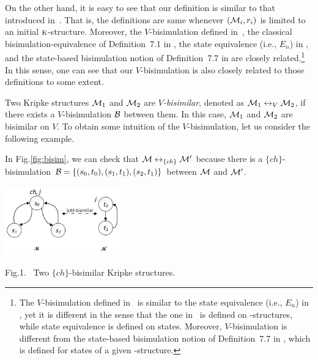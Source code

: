 \documentclass[runningheads]{llncs}
\begin{document}
On the other hand, it is easy to see that our definition is similar to that introduced in~\cite{renyansfirstpaper}. That is, the definitions are same whenever $({\cal M}_i, r_i)$ is limited to an initial $\textsc{k}$-structure.
Moreover, the $V$-bisimulation defined in~\cite{renyansfirstpaper}, the classical
bisimulation-equivalence of Definition~7.1 in \cite{Baier:PMC:2008}, the state equivalence (i.e., $E_n$) in \cite{browne1988characterizing}, and the state-based bisimulation notion of Definition~7.7 in \cite{Baier:PMC:2008} are closely related.\footnote{The $V$-bisimulation defined in~\cite{renyansfirstpaper} is similar to
	the state equivalence (i.e., $E_n$) in \cite{browne1988characterizing}, yet it is
	different in the sense that the one in~\cite{renyansfirstpaper} is defined on \MPK-structures,
	while state equivalence is defined on states.
	Moreover, $V$-bisimulation is different
	from  the state-based bisimulation notion of Definition~7.7 in \cite{Baier:PMC:2008},
	which is defined for states of a given \MPK-structure.}
In this sense, one can see that our $V$-bisimulation is also closely related to those definitions to some extent.

Two Kripke structures ${\cal M}_1$ and ${\cal M}_2$ are \emph{$V$-bisimilar}, denoted as ${\cal M}_1 \leftrightarrow_V {\cal M}_2$, if there exists a $V$-bisimulation ${\cal B}$ between them.
In this case, ${\cal M}_1$ and ${\cal M}_2$ are bisimilar on $V$.
To obtain  some intuition of the $V$-bisimulation, let us consider the following example.

\begin{example}
	In Fig.\ref{fig:bisim}, we can check that ${\cal M} \leftrightarrow_{\{ch\}} {\cal M}'$ because there is a $\{ch\}$-bisimulation ${\cal B}=\{(s_0, t_0), (s_1, t_1), (s_2, t_1)\}$ between ${\cal M}$ and ${\cal M}'$.
	
	
	\begin{center}\label{fig:bisim}
		\includegraphics[width=5cm,height=3cm]{chBisimilar.png}\\
		\parbox[c]{6cm}{\footnotesize{Fig.1.~}  Two $\{ch\}$-bisimilar Kripke structures.}%
	\end{center}
	
	
\end{example}
\end{document}
